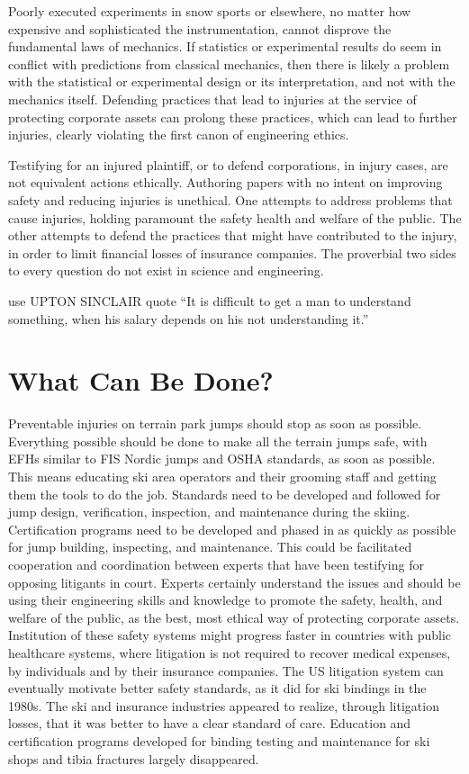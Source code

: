 \documentclass[smallextended]{svjour3}       %
\begin{document}
Poorly executed experiments in snow sports or elsewhere, no matter how
expensive and sophisticated the instrumentation, cannot disprove the
fundamental laws of mechanics. If statistics or experimental results do seem in
conflict with predictions from classical mechanics, then there is likely a
problem with the statistical or experimental design or its interpretation, and
not with the mechanics itself. Defending practices that lead to injuries at the
service of protecting corporate assets can prolong these practices, which can
lead to further injuries, clearly violating the first canon of engineering
ethics.

Testifying for an injured plaintiff, or to defend corporations, in injury
cases, are not equivalent actions ethically. Authoring papers with no intent on
improving safety and reducing injuries is unethical. One attempts to address
problems that cause injuries, holding paramount the safety health and welfare
of the public. The other attempts to defend the practices that might have
contributed to the injury, in order to limit financial losses of insurance
companies. The proverbial two sides to every question do not exist in science
and engineering.

use UPTON SINCLAIR quote \cite{Sinclair1994}
“It is difficult to get a man to understand something, when his salary depends on his not understanding it.”

\section{What Can Be Done?}
\label{sec:action}
%
Preventable injuries on terrain park jumps should stop as soon as possible. Everything possible should be done to make all the terrain jumps safe, with EFHs similar to FIS Nordic jumps and OSHA standards, as soon as possible. This means educating ski area operators and their grooming staff and getting them the tools to do the job. Standards need to be developed and followed for jump design, verification, inspection, and maintenance during the skiing.  Certification programs need to be developed and phased in as quickly as possible for jump building, inspecting, and maintenance.  This could be facilitated cooperation and coordination between experts that have been testifying for opposing litigants in court. Experts certainly understand the issues and should be using their engineering skills and knowledge to promote the safety, health, and welfare of the public, as the best, most ethical way of protecting corporate assets. Institution of these safety systems might progress faster in countries with public healthcare systems, where litigation is not required to recover medical expenses, by individuals and by their insurance companies. The US litigation system can eventually motivate  better safety standards, as it did for ski bindings in the 1980s.  The ski and insurance industries appeared to realize, through litigation losses, that it was better to have a clear standard of care. Education and certification programs developed for binding testing and maintenance for ski shops and tibia fractures largely disappeared.       
\end{document}
